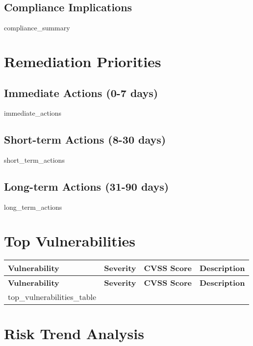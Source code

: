 \documentclass[11pt,a4paper]{article}
\begin{document}
\subsection{Compliance Implications}

{{compliance_summary}}

\section{Remediation Priorities}

\subsection{Immediate Actions (0-7 days)}
\begin{enumerate}
    {{immediate_actions}}
\end{enumerate}

\subsection{Short-term Actions (8-30 days)}
\begin{enumerate}
    {{short_term_actions}}
\end{enumerate}

\subsection{Long-term Actions (31-90 days)}
\begin{enumerate}
    {{long_term_actions}}
\end{enumerate}

\section{Top Vulnerabilities}

\begin{longtable}{|p{3cm}|p{2cm}|p{2cm}|p{6cm}|}
\hline
\textbf{Vulnerability} & \textbf{Severity} & \textbf{CVSS Score} & \textbf{Description} \\
\hline
\endfirsthead

\hline
\textbf{Vulnerability} & \textbf{Severity} & \textbf{CVSS Score} & \textbf{Description} \\
\hline
\endhead

{{top_vulnerabilities_table}}

\end{longtable}

\section{Risk Trend Analysis}
\end{document}
